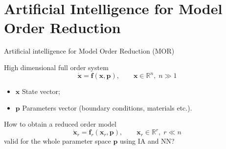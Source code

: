 \documentclass{beamer}
\begin{document}
\section{Artificial Intelligence for Model Order Reduction}

\begin{frame}{Artificial intelligence for Model Order Reduction (MOR)}


High dimensional full order system
\begin{equation*}
	\dot{\mathbf{x}} = \mathbf{f}(\mathbf{x}, \mathbf{p}), \qquad \mathbf{x} \in \mathbb{R}^n, \; n \gg 1
\end{equation*}
\begin{itemize}
	\item $\mathbf{x}$ State vector;
	\item $\mathbf{p}$ Parameters vector (boundary conditions, materials etc.).
\end{itemize}
How to obtain a reduced order model
\begin{equation*}
	\dot{\mathbf{x}}_r = \mathbf{f}_r(\mathbf{x}_r, \mathbf{p}), \qquad \mathbf{x}_r \in \mathbb{R}^r, \; r \ll n
\end{equation*}
valid for the whole parameter space $\mathbf{p}$ using IA and NN?

\end{frame}
\end{document}
